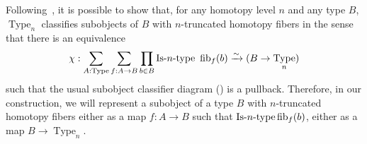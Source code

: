 \documentclass[notfinal]{jfrarticle}
\DeclareMathOperator{\Type}{Type}
\DeclareMathOperator{\im}{Im}
\newcommand \defeq {\overset{de\hspace{-0.2ex}f}{=}}
\def\mymathhyphen{{\hbox{-}}}
\newcommand{\IsType}[1]
{\mathop{\mathrm{Is\mymathhyphen}#1\mathrm{\mymathhyphen type}} }
\newcommand \fib[2] {\mathrm{fib}_{#1}(#2)}
\newcommand{\ie}{\emph{i.e.}}
\begin{document}
Following~\cite{sets_in_hott}, it is possible to show that, for any
homotopy level $n$ and any type $B$, $\Type_n$ classifies subobjects
of $B$ with $n$-truncated homotopy fibers in the sense that there is
an equivalence
%
\[
  \chi : \sum_{A:\Type} \sum_{f:A \to B} \prod_{b\in B}
\IsType n\
\fib{f}{b} \xrightarrow{\sim} 
 (B \to \Type_n)
\]
%
 such that the usual subobject
 classifier diagram (\cite[Theorem 4.8.4]{hottbook}) is a pullback.
Therefore, in our construction, we will represent a subobject of a
type $B$ with $n$-truncated homotopy fibers either as a map $f:A\to B$
such that $\IsType n \fib{f}{b}$, either as a map $B\to \Type_n$.





\end{document}

